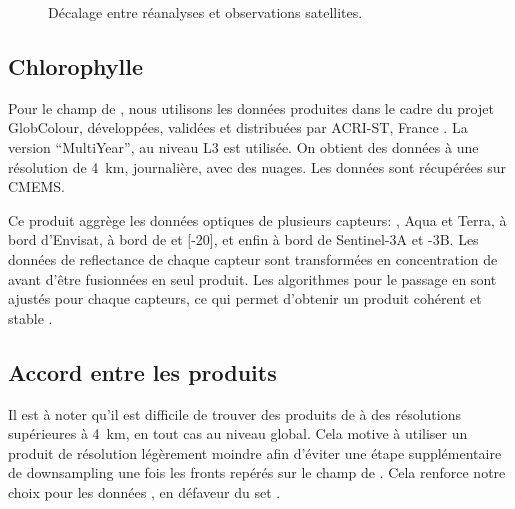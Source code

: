 \documentclass[index]{subfiles}
\begin{document}

\begin{figure}
  \caption{Décalage entre réanalyses et observations satellites.}
  \label{fig:decalage-reanalyses}
\end{figure}

\subsection{Chlorophylle}
\label{sec:donnees-chl}

Pour le champ de , nous utilisons les données produites dans le cadre du projet GlobColour, développées, validées et distribuées par ACRI-ST, France \parencite{maritorena_2002}.
La version \enquote{MultiYear}, au niveau L3 est utilisée.
On obtient des données à une résolution de \qty{4}{\km}, journalière, avec des nuages.
Les données sont récupérées sur \gls{CMEMS}.

Ce produit aggrège les données optiques de plusieurs capteurs: ,  Aqua et Terra,  à bord d'Envisat,  à bord de  et [-20], et enfin  à bord de Sentinel-3A et -3B.
Les données de reflectance de chaque capteur sont transformées en concentration de  avant d'être fusionnées en seul produit.
Les algorithmes pour le passage en  sont ajustés pour chaque capteurs, ce qui permet d'obtenir un produit cohérent et stable \parencite{garnesson_2019}.


\subsection{Accord entre les produits}

Il est à noter qu'il est difficile de trouver des produits de  à des résolutions supérieures à \qty{4}{\km}, en tout cas au niveau global.
Cela motive à utiliser un produit  de résolution légèrement moindre afin d'éviter une étape supplémentaire de downsampling une fois les fronts repérés sur le champ de .
Cela renforce notre choix pour les données , en défaveur du set .
\end{document}
